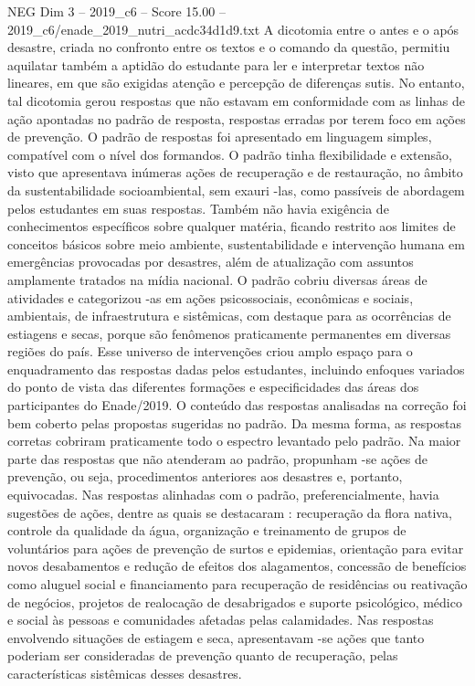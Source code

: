 \begin{textsample}{NEG Dim 3 – 2019\_c6 – Score 15.00 – 2019\_c6/enade\_2019\_nutri\_acdc34d1d9.txt}
A dicotomia entre o antes e o após desastre, criada no confronto entre os textos e o comando da questão, permitiu aquilatar também a aptidão do estudante para ler e interpretar textos não lineares, em que são exigidas atenção e percepção de diferenças sutis.
No entanto, tal dicotomia gerou respostas que não estavam em conformidade com as linhas de ação apontadas no padrão de resposta, respostas erradas por terem foco em ações de prevenção.
O padrão de respostas foi apresentado em linguagem simples, compatível com o nível dos formandos.
O padrão tinha flexibilidade e extensão, visto que apresentava inúmeras ações de recuperação e de restauração, no âmbito da sustentabilidade socioambiental, sem exauri -las, como passíveis de abordagem pelos estudantes em suas respostas.
Também não havia exigência de conhecimentos específicos sobre qualquer matéria, ficando restrito aos limites de conceitos básicos sobre meio ambiente, sustentabilidade e intervenção humana em emergências provocadas por desastres, além de atualização com assuntos amplamente tratados na mídia nacional.
O padrão cobriu diversas áreas de atividades e categorizou -as em ações psicossociais, econômicas e sociais, ambientais, de infraestrutura e sistêmicas, com destaque para as ocorrências de estiagens e secas, porque são fenômenos praticamente permanentes em diversas regiões do país.
Esse universo de intervenções criou amplo espaço para o enquadramento das respostas dadas pelos estudantes, incluindo enfoques variados do ponto de vista das diferentes formações e especificidades das áreas dos participantes do Enade/2019.
O conteúdo das respostas analisadas na correção foi bem coberto pelas propostas sugeridas no padrão.
Da mesma forma, as respostas corretas cobriram praticamente todo o espectro levantado pelo padrão.
Na maior parte das respostas que não atenderam ao padrão, propunham -se ações de prevenção, ou seja, procedimentos anteriores aos desastres e, portanto, equivocadas.
Nas respostas alinhadas com o padrão, preferencialmente, havia sugestões de ações, dentre as quais se destacaram : recuperação da flora nativa, controle da qualidade da água, organização e treinamento de grupos de voluntários para ações de prevenção de surtos e epidemias, orientação para evitar novos desabamentos e redução de efeitos dos alagamentos, concessão de benefícios como aluguel social e financiamento para recuperação de residências ou reativação de negócios, projetos de realocação de desabrigados e suporte psicológico, médico e social às pessoas e comunidades afetadas pelas calamidades.
Nas respostas envolvendo situações de estiagem e seca, apresentavam -se ações que tanto poderiam ser consideradas de prevenção quanto de recuperação, pelas características sistêmicas desses desastres.

\end{textsample}
